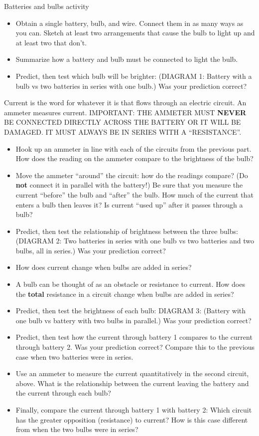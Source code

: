 \documentclass{article}
\begin{document}
Batteries and bulbs activity
\begin{itemize}
  \item Obtain a single battery, bulb, and wire. Connect them in as many ways as you can. Sketch at least two arrangements that cause the bulb to light up and at least two that don't.
  \item Summarize how a battery and bulb must be connected to light the bulb.
  \item Predict, then test which bulb will be brighter: (DIAGRAM 1: Battery with a bulb vs two batteries in series with one bulb.) Was your prediction correct?
\end{itemize}

Current is the word for whatever it is that flows through an electric circuit.
An ammeter measures current. IMPORTANT: THE AMMETER MUST \textbf{NEVER} BE CONNECTED DIRECTLY ACROSS THE BATTERY OR IT WILL BE DAMAGED. IT MUST ALWAYS BE IN SERIES WITH A ``RESISTANCE''.

\begin{itemize}
  \item Hook up an ammeter in line with each of the circuits from the previous part. How does the reading on the ammeter compare to the brightness of the bulb?
  \item Move the ammeter ``around'' the circuit: how do the readings compare? (Do \textbf{not} connect it in parallel with the battery!) Be sure that you measure the current ``before'' the bulb and ``after'' the bulb. How much of the current that enters a bulb then leaves it? Is current ``used up'' after it passes through a bulb?
  \item Predict, then test the relationship of brightness between the three bulbs: (DIAGRAM 2: Two batteries in series with one bulb vs two batteries and two bulbs, all in series.) Was your prediction correct?
  \item How does current change when bulbs are added in series?
  \item A bulb can be thought of as an obstacle or resistance to current. How does the \textbf{total} resistance in a circuit change when bulbs are added in series?
  \item Predict, then test the brightness of each bulb: DIAGRAM 3: (Battery with one bulb vs battery with two bulbs in parallel.) Was your prediction correct?
  \item Predict, then test how the current through battery 1 compares to the current through battery 2. Was your prediction correct? Compare this to the previous case when two batteries were in series.
  \item Use an ammeter to measure the current quantitatively in the second circuit, above. What is the relationship between the current leaving the battery and the current through each bulb?
  \item Finally, compare the current through battery 1 with battery 2: Which circuit has the greater opposition (resistance) to current? How is this case different from when the two bulbs were in series?
\end{itemize}
\end{document}
